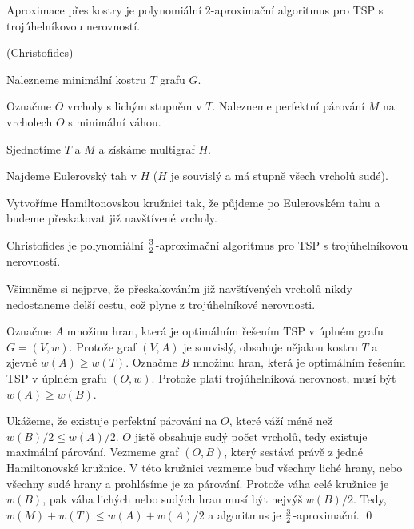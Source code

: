 \vt Aproximace přes kostry je polynomiální 2-aproximační algoritmus pro TSP s
trojúhelníkovou nerovností.

\alg (Christofides)
\begin{enumerate*}
\item Nalezneme minimální kostru $T$ grafu $G$.
\item Označme $O$ vrcholy s lichým stupněm v $T$. Nalezneme perfektní párování
$M$ na vrcholech $O$ s minimální váhou.
\item Sjednotíme $T$ a $M$ a získáme multigraf $H$.
\item Najdeme Eulerovský tah v $H$ ($H$ je souvislý a má stupně všech vrcholů sudé).
\item Vytvoříme Hamiltonovskou kružnici tak, že půjdeme po Eulerovském tahu a
budeme přeskakovat již navštívené vrcholy.
\end{enumerate*}

\vt Christofides je polynomiální $3\over 2$-aproximační algoritmus pro TSP s
trojúhelníkovou nerovností.

\dk Všimněme si nejprve, že přeskakováním již navštívených vrcholů nikdy
nedostaneme delší cestu, což plyne z trojúhelníkové nerovnosti.

Označme $A$ množinu hran, která je optimálním řešením TSP v úplném grafu $G =
(V,w)$. Protože graf $(V,A)$ je souvislý, obsahuje nějakou kostru $T$ a zjevně
$w(A) \ge w(T)$. Označme $B$ množinu hran, která je optimálním řešením TSP v
úplném grafu $(O,w)$. Protože platí trojúhelníková nerovnost, musí být $w(A) \ge
w(B)$.

Ukážeme, že existuje perfektní párování na $O$, které váží méně než $w(B)/2 \le
w(A)/2$. $O$ jistě obsahuje sudý počet vrcholů, tedy existuje maximální
párování. Vezmeme graf $(O,B)$, který sestává právě z jedné Hamiltonovské
kružnice. V této kružnici vezmeme buď všechny liché hrany, nebo všechny sudé
hrany a prohlásíme je za párování. Protože váha celé kružnice je $w(B)$, pak
váha lichých nebo sudých hran musí být nejvýš $w(B)/2$. Tedy, $w(M) + w(T) \le
w(A) + w(A)/2$ a algoritmus je $3\over 2$-aproximační. 
\qed




